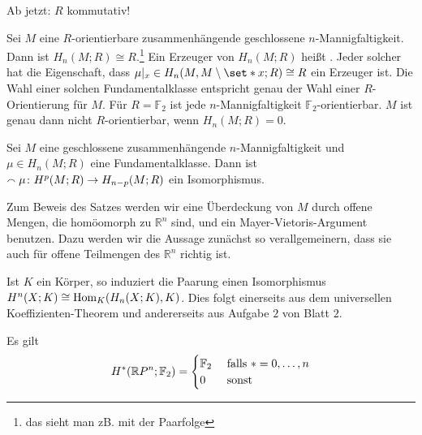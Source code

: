 Ab jetzt: $R$ kommutativ!

\begin{erinnerungA}
	Sei $M$ eine $R$-orientierbare zusammenhängende geschlossene $n$-Mannigfaltigkeit. 
	Dann ist $H_n(M;R) \cong R$.\footnote{das sieht man zB. mit der Paarfolge}
	Ein Erzeuger von $H_n(M;R)$ heißt .
	Jeder solcher hat die Eigenschaft, dass $\mu|_x \in H_n(M,M \setminus \set*{x};R) \cong R$ ein Erzeuger ist. 
	Die Wahl einer solchen Fundamentalklasse entspricht genau der Wahl einer $R$-Orientierung für $M$.
	Für $R=\mathbb{F}_2$ ist jede $n$-Mannigfaltigkeit $\mathbb{F}_2$-orientierbar. 
	$M$ ist genau dann nicht $R$-orientierbar, wenn $H_n(M;R)=0$.
\end{erinnerungA}

\begin{satz}[{name={Dualitätssatz von Poincaré für geschlossene Mannigfaltigkeiten}},label=poincare]
	Sei $M$ eine geschlossene zusammenhängende $n$-Mannigfaltigkeit und $\mu \in H_n(M;R)$ eine Fundamentalklasse. 
	Dann ist $\smallfrown \mu \colon H^p(M;R) \to H_{n-p}(M;R)$ ein Isomorphismus.
\end{satz}

\begin{bemerkung}
	Zum Beweis des Satzes werden wir eine Überdeckung von $M$ durch offene Mengen, die homöomorph zu $\mathbb{R}^n$ sind, und ein Mayer-Vietoris-Argument benutzen.
	Dazu werden wir die Aussage zunächst so verallgemeinern, dass sie auch für offene Teilmengen des $\mathbb{R}^n$ richtig ist.
\end{bemerkung}

\begin{bemerkung}
	Ist $K$ ein Körper, so induziert die Paarung
	einen Isomorphismus $H^n(X;K) \cong \Hom_K \enbrace*{H_n(X;K),K}$. 
	Dies folgt einerseits aus dem universellen Koeffizienten-Theorem und andererseits aus Aufgabe $2$ von Blatt $2$.
\end{bemerkung}

\begin{beispiel}[{name=[Kohomologie des reell projektiven Raumes]}]
	Es gilt 
	\[
		H^* \enbrace*{\mathbb{R}P^n;\mathbb{F}_2} = \begin{cases}
			\mathbb{F}_2 &\text{ falls }*=0,\ldots ,n\\
			0 &\text{ sonst }
		\end{cases}
	\]
\end{beispiel}

